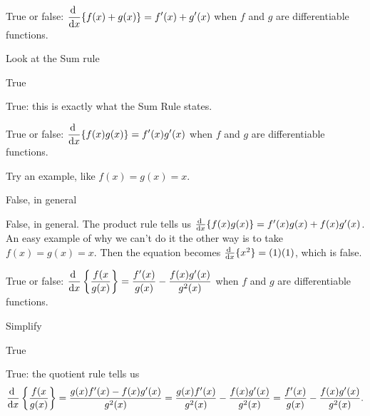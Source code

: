 %
%
\subsection*{\Conceptual}



\begin{question}True or false: $\ds\diff{}{x}\{f(x)+g(x)\}=f'(x)+g'(x)$ when $f$ and $g$ are differentiable functions.
\end{question}
\begin{hint} Look at the Sum rule
\end{hint}
\begin{answer} True
\end{answer}
\begin{solution} True: this is exactly what the Sum Rule states.
\end{solution}


\begin{question}
True or false: $\ds\diff{}{x}\{f(x)g(x)\}=f'(x)g'(x)$ when $f$ and $g$ are differentiable functions.
\end{question}
\begin{hint} Try an example, like $f(x)=g(x)=x$.
\end{hint}
\begin{answer} False, in general
\end{answer}
\begin{solution} False, in general. The product rule tells us $\diff{}{x}\{f(x)g(x)\}=f'(x)g(x)+f(x)g'(x)$. An easy example of why we can't do it the other way is to take $f(x)=g(x)=x$. Then the equation becomes $\diff{}{x}\{x^2\}=(1)(1)$, which is false.
\end{solution}


\begin{question}True or false: $\ds\diff{}{x}\left\{\dfrac{f(x}{g(x)}\right\}=\dfrac{f'(x)}{g(x)}-\dfrac{f(x)g'(x)}{g^2(x)}$ when $f$ and $g$ are differentiable functions.
\end{question}
\begin{hint} Simplify
\end{hint}
\begin{answer} True
\end{answer}
\begin{solution} True: the quotient rule tells us \[\diff{}{x}\left\{\frac{f(x}{g(x)}\right\}=\frac{g(x)f'(x)-f(x)g'(x)}{g^2(x)} = \frac{g(x)f'(x)}{g^2(x)}-\frac{f(x)g'(x)}{g^2(x)} = \frac{f'(x)}{g(x)}-\frac{f(x)g'(x)}{g^2(x)}.\]
\end{solution}

